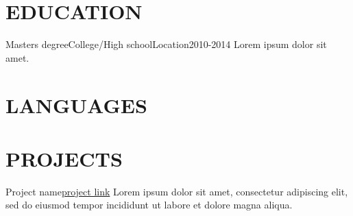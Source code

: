 \documentclass[10pt, a4paper]{article}
\begin{document}
\section{EDUCATION}


\begin{cvitem}{Masters degree}{College/High school}{Location}{2010-2014}
    Lorem ipsum dolor sit amet.
\end{cvitem}

\section{LANGUAGES}

\begin{langs}
     
\end{langs}

\cefrdesc %

\section{PROJECTS}


\begin{projitem}{Project name}{\href{https://link}{project link}}
    Lorem ipsum dolor sit amet, consectetur adipiscing elit, sed do eiusmod tempor incididunt ut labore et dolore magna aliqua.
\end{projitem}


\fincols


\end{document}
